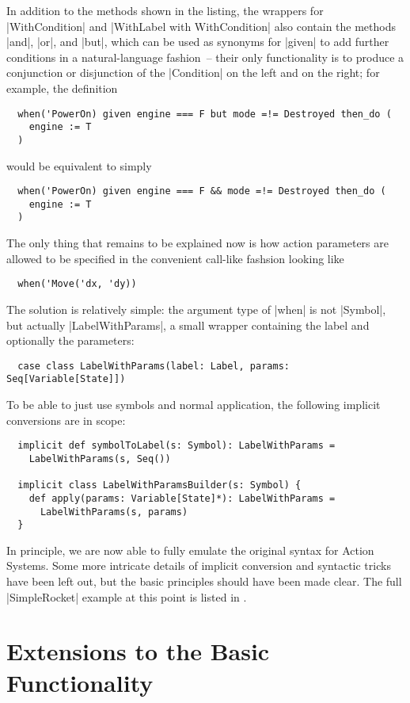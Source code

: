 In addition to the methods shown in the listing, the wrappers for |WithCondition| and %
|WithLabel with WithCondition| also contain the methods |and|, |or|, and |but|, which can be used as
synonyms for |given| to add further conditions in a natural-language fashion~-- their only
functionality is to produce a conjunction or disjunction of the |Condition| on the left and on the
right; for example, the definition\enlargethispage{1em}
\begin{lstlisting}
  when('PowerOn) given engine === F but mode =!= Destroyed then_do (
    engine := T
  )
\end{lstlisting}
would be equivalent to simply
\begin{lstlisting}
  when('PowerOn) given engine === F && mode =!= Destroyed then_do (
    engine := T
  )
\end{lstlisting}


The only thing that remains to be explained now is how action parameters are allowed to be specified
in the convenient call-like fashsion looking like
\begin{lstlisting}
  when('Move('dx, 'dy))
\end{lstlisting}
The solution is relatively simple: the argument type of |when| is not |Symbol|, but actually
|LabelWithParams|, a small wrapper containing the label and optionally the parameters:
\begin{lstlisting}
  case class LabelWithParams(label: Label, params: Seq[Variable[State]])
\end{lstlisting}
To be able to just use symbols and normal application, the following implicit conversions are in scope:
\begin{lstlisting}
  implicit def symbolToLabel(s: Symbol): LabelWithParams = 
    LabelWithParams(s, Seq())

  implicit class LabelWithParamsBuilder(s: Symbol) {
    def apply(params: Variable[State]*): LabelWithParams = 
      LabelWithParams(s, params)
  }
\end{lstlisting}

In principle, we are now able to fully emulate the original syntax for Action Systems. Some more
intricate details of implicit conversion and syntactic tricks have been left out, but the basic
principles should have been made clear. The full |SimpleRocket| example at this point is listed in
.


\section{Extensions to the Basic Functionality}
\label{sec:extending_functionality}

